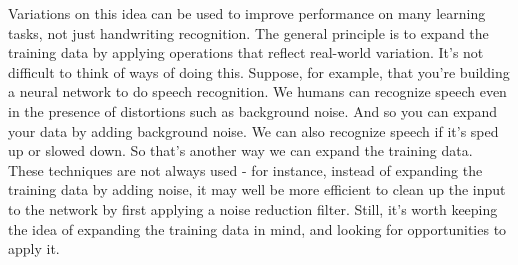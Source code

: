 Variations on this idea can be used to improve performance on many learning tasks, not just handwriting recognition. The general principle is to expand the training data by applying operations that reflect real-world variation. It's not difficult to think of ways of doing this. Suppose, for example, that you're building a neural network to do speech recognition. We humans can recognize speech even in the presence of distortions such as background noise. And so you can expand your data by adding background noise. We can also recognize speech if it's sped up or slowed down. So that's another way we can expand the training data. These techniques are not always used - for instance, instead of expanding the training data by adding noise, it may well be more efficient to clean up the input to the network by first applying a noise reduction filter. Still, it's worth keeping the idea of expanding the training data in mind, and looking for opportunities to apply it.

